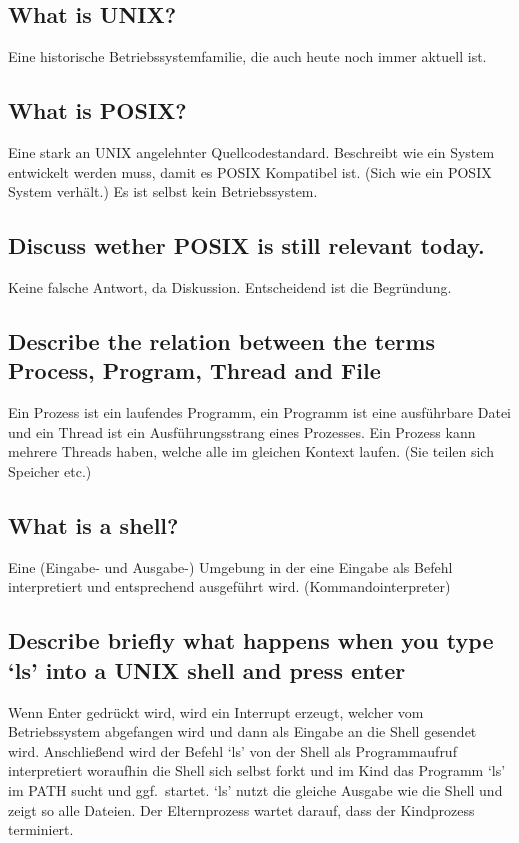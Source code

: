 \subsection{What is UNIX?}
Eine historische Betriebssystemfamilie, die auch heute noch immer aktuell ist.

\subsection{What is POSIX?}
Eine stark an UNIX angelehnter Quellcodestandard.
Beschreibt wie ein System entwickelt werden muss, damit es POSIX Kompatibel ist.
(Sich wie ein POSIX System verhält.)
Es ist selbst kein Betriebssystem.

\subsection{Discuss wether POSIX is still relevant today.}
Keine falsche Antwort, da Diskussion.
Entscheidend ist die Begründung.

\subsection{\important Describe the relation between the terms Process, Program, Thread and File}
Ein Prozess ist ein laufendes Programm, ein Programm ist eine ausführbare Datei und ein Thread ist ein Ausführungsstrang eines Prozesses.
Ein Prozess kann mehrere Threads haben, welche alle im gleichen Kontext laufen. (Sie teilen sich Speicher etc.)

\subsection{What is a shell?}
Eine (Eingabe- und Ausgabe-) Umgebung in der eine Eingabe als Befehl interpretiert und entsprechend ausgeführt wird.
(Kommandointerpreter)

\subsection{Describe briefly what happens when you type `ls' into a UNIX shell and press enter}
Wenn Enter gedrückt wird, wird ein Interrupt erzeugt, welcher vom Betriebssystem abgefangen wird und dann als Eingabe an die Shell gesendet wird.
Anschließend wird der Befehl `ls' von der Shell als Programmaufruf interpretiert woraufhin die Shell sich selbst forkt und im Kind das Programm `ls' im PATH sucht und ggf.\ startet.
`ls' nutzt die gleiche Ausgabe wie die Shell und zeigt so alle Dateien.
Der Elternprozess wartet darauf, dass der Kindprozess terminiert.

